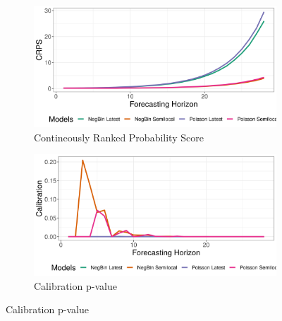 \begin{figure}[H]
\begin{subfigure}{0.5\textwidth}
  \centering
  \includegraphics[width=\linewidth]{../output/Lubero_crps.png}  
  \caption{Contineously Ranked Probability Score}
  \label{Lubero_scores_1}
\end{subfigure}
\begin{subfigure}{0.5\textwidth}
  \centering
  \includegraphics[width=\linewidth]{../output/Lubero_calibration.png}  
  \caption{Calibration p-value}
  \label{Lubero_scores_2}
\end{subfigure}


\end{figure}
